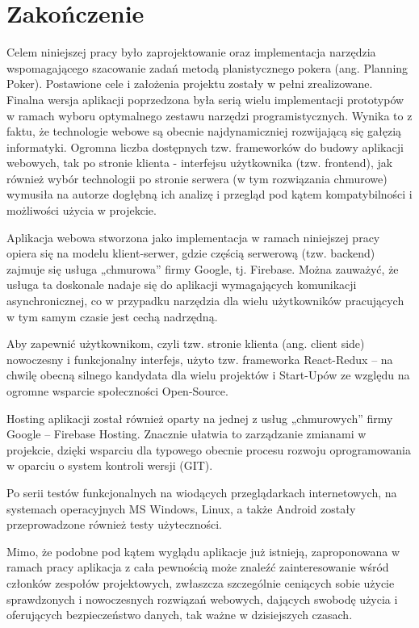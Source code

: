 ﻿\chapter*{Zakończenie}

Celem niniejszej pracy było zaprojektowanie oraz implementacja narzędzia wspomagającego szacowanie zadań metodą planistycznego pokera (ang. Planning Poker).
Postawione cele i założenia projektu zostały w pełni zrealizowane.
Finalna wersja aplikacji poprzedzona była serią wielu implementacji prototypów w ramach wyboru optymalnego zestawu narzędzi programistycznych.
Wynika to z faktu, że technologie webowe są obecnie najdynamiczniej rozwijającą się gałęzią informatyki.
Ogromna liczba dostępnych tzw. frameworków do budowy aplikacji webowych, tak po stronie klienta - interfejsu użytkownika (tzw. frontend),
jak również wybór technologii po stronie serwera (w tym rozwiązania chmurowe)
wymusiła na autorze dogłębną ich analizę i przegląd pod kątem kompatybilności i możliwości użycia w projekcie.


Aplikacja webowa stworzona jako implementacja w ramach niniejszej pracy opiera się na modelu klient-serwer,
gdzie częścią serwerową (tzw. backend) zajmuje się usługa „chmurowa” firmy Google, tj. Firebase. Można zauważyć,
że usługa ta doskonale nadaje się do aplikacji wymagających komunikacji asynchronicznej,
co w przypadku narzędzia dla wielu użytkowników pracujących w tym samym czasie jest cechą nadrzędną.

Aby zapewnić użytkownikom, czyli tzw. stronie klienta (ang. client side) nowoczesny i funkcjonalny interfejs,
użyto tzw. frameworka React-Redux – na chwilę obecną silnego kandydata dla wielu projektów i Start-Upów ze względu na ogromne wsparcie społeczności Open-Source.

Hosting aplikacji został również oparty na jednej z usług „chmurowych” firmy Google – Firebase Hosting.
Znacznie ułatwia to zarządzanie zmianami w projekcie, dzięki wsparciu dla typowego obecnie procesu rozwoju oprogramowania w oparciu o system kontroli wersji (GIT).

Po serii testów funkcjonalnych na wiodących przeglądarkach internetowych, na systemach operacyjnych MS Windows,
Linux, a także Android zostały przeprowadzone również testy użyteczności.

Mimo, że podobne pod kątem wyglądu aplikacje już istnieją,
zaproponowana w ramach pracy aplikacja z cała pewnością może znaleźć zainteresowanie wśród członków zespołów projektowych,
zwłaszcza szczególnie ceniących sobie użycie sprawdzonych i nowoczesnych rozwiązań webowych,
dających swobodę użycia i oferujących bezpieczeństwo danych, tak ważne w dzisiejszych czasach.

